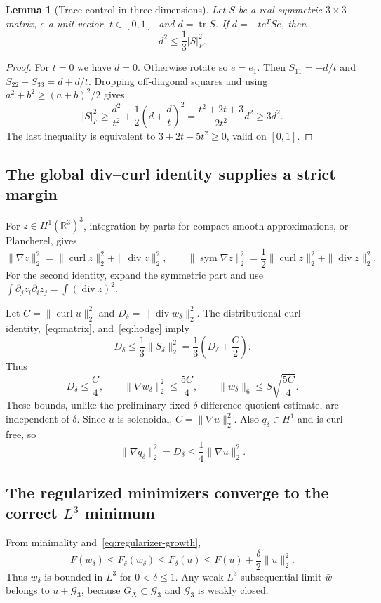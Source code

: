 \documentclass[11pt,a4paper]{article}
\newtheorem{lemma}[theorem]{Lemma}
\theoremstyle{definition}
\newcommand{\R}{\mathbb R}
\newcommand{\G}{\mathcal G_3}
\DeclareMathOperator{\diver}{div}
\DeclareMathOperator{\curl}{curl}
\DeclareMathOperator{\sym}{sym}
\DeclareMathOperator{\tr}{tr}
\begin{document}
\begin{lemma}[Trace control in three dimensions]\label{lem:matrix}
Let $S$ be a real symmetric $3\times3$ matrix, $e$ a unit vector, $t\in[0,1]$, and $d=\tr S$. If $d=-t e^TSe$, then
\begin{equation}\label{eq:matrix}
 d^2\le\frac13|S|_F^2.
\end{equation}
\end{lemma}
\begin{proof}
For $t=0$ we have $d=0$. Otherwise rotate so $e=e_1$. Then
$S_{11}=-d/t$ and $S_{22}+S_{33}=d+d/t$. Dropping off-diagonal squares and using $a^2+b^2\ge(a+b)^2/2$ gives
\[
 |S|_F^2\ge\frac{d^2}{t^2}+\frac12\left(d+\frac dt\right)^2
 =\frac{t^2+2t+3}{2t^2}d^2\ge3d^2.
\]
The last inequality is equivalent to $3+2t-5t^2\ge0$, valid on $[0,1]$.
\end{proof}

\subsection{The global div--curl identity supplies a strict margin}
For $z\in H^1(\R^3)^3$, integration by parts for compact smooth approximations, or Plancherel, gives
\begin{equation}\label{eq:hodge}
 \|\nabla z\|_2^2=\|\curl z\|_2^2+\|\diver z\|_2^2,
 \qquad
 \|\sym\nabla z\|_2^2=\frac12\|\curl z\|_2^2+\|\diver z\|_2^2.
\end{equation}
For the second identity, expand the symmetric part and use
$\int\partial_jz_i\partial_i z_j=\int(\diver z)^2$.

Let $C=\|\curl u\|_2^2$ and $D_\delta=\|\diver w_\delta\|_2^2$. The distributional curl identity,~\eqref{eq:matrix}, and~\eqref{eq:hodge} imply
\[
 D_\delta\le\frac13\|S_\delta\|_2^2
 =\frac13\left(D_\delta+\frac C2\right).
\]
Thus
\begin{equation}\label{eq:uniform-h1}
 D_\delta\le\frac C4,\qquad
 \|\nabla w_\delta\|_2^2\le\frac{5C}{4},\qquad
 \|w_\delta\|_6\le S\sqrt{\frac{5C}{4}}.
\end{equation}
These bounds, unlike the preliminary fixed-$\delta$ difference-quotient estimate, are independent of $\delta$. Since $u$ is solenoidal, $C=\|\nabla u\|_2^2$. Also $q_\delta\in H^1$ and is curl free, so
\begin{equation}\label{eq:qdelta}
 \|\nabla q_\delta\|_2^2=D_\delta\le\frac14\|\nabla u\|_2^2.
\end{equation}

\subsection{The regularized minimizers converge to the correct \texorpdfstring{$L^3$}{L3} minimum}
From minimality and~\eqref{eq:regularizer-growth},
\[
 F(w_\delta)\le F_\delta(w_\delta)\le F_\delta(u)
 \le F(u)+\frac\delta2\|u\|_2^2.
\]
Thus $w_\delta$ is bounded in $L^3$ for $0<\delta\le1$. Any weak $L^3$ subsequential limit $\bar w$ belongs to $u+\G$, because $G_X\subset\G$ and $\G$ is weakly closed.
\end{document}
